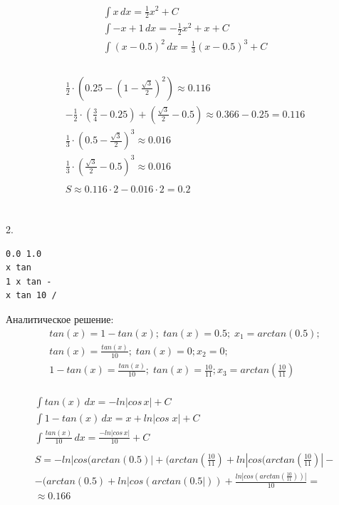 \documentclass[a4paper,12pt,titlepage,finall]{article}
\begin{document}
$$
\begin{gathered}
\int x\,dx = \frac{1}{2} x^2 + C\\
\int -x+1\,dx = -\frac{1}{2}x^2+x + C\\
\int (x-0.5)^2\,dx = \frac{1}{3}(x-0.5)^3 + C\\\\
\end{gathered}
$$

$$
\begin{gathered}
\frac{1}{2}\cdot(0.25 - (1 - \frac{\sqrt{3}}{2})^2) \approx 0.116\\
-\frac{1}{2}\cdot(\frac{3}{4} - 0.25) + (\frac{\sqrt{3}}{2} - 0.5) \approx 0.366 - 0.25 = 0.116\\
\frac{1}{3}\cdot (0.5 - \frac{\sqrt{3}}{2})^3 \approx 0.016\\
\frac{1}{3}\cdot (\frac{\sqrt{3}}{2}-0.5)^3 \approx 0.016\\\\
S \approx 0.116 \cdot 2 - 0.016 \cdot 2 = 0.2
\end{gathered}
$$
\\\\

2.
\begin{verbatim}
0.0 1.0
x tan
1 x tan -
x tan 10 /
\end{verbatim}
Аналитическое решение:
$$
\begin{gathered}
tan(x) = 1 - tan(x);\;tan(x) = 0.5;\; x_1 = arctan(0.5);\\
tan(x) = \frac{tan(x)}{10};\;tan(x) = 0; x_2 = 0;\\
1 - tan(x) = \frac{tan(x)}{10};\;tan(x)=\frac{10}{11}; x_3 = arctan(\frac{10}{11})\\
\end{gathered}
$$

$$
\begin{gathered}
\int tan(x)\,dx = -ln|cos\,x| + C\\
\int 1 - tan(x)\,dx = x + ln|cos\;x|+C\\
\int \frac{tan(x)}{10}\,dx = \frac{-ln|cos\,x|}{10} + C\\\\
S = -ln|cos(arctan(0.5)| + (arctan(\frac{10}{11}) + ln|cos(arctan(\frac{10}{11})| - \\- (arctan(0.5)+ln|cos(arctan(0.5|)) + \frac{ln|cos(arctan(\frac{10}{11}))|}{10} = \\
\approx 0.166
\end{gathered}
$$
\end{document}
